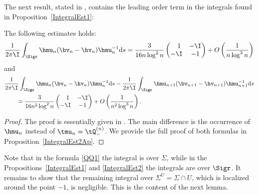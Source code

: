The next result, stated in \cite[Section~5]{CD}, contains the leading order term in the integrals found in Proposition~\ref{IntegralEst1}:
\begin{Proposition}\label{IntegralEst2}
 The following estimates holds:
\begin{align*}
\frac{1}{2\pi\I} \int_{\Sigr} \hmu_n(\bv_n-\hv_n)\hmu_n^{-1} {\rm d}s = \frac{3}{16n \log^2n} \begin{pmatrix}
\phantom{-}1 & -\I\\
-\I & -1
\end{pmatrix} + O\left(\frac{1}{n\log^3 n}\right)
\end{align*}
and
\begin{align*}
 & \frac{1}{2\pi\I} \int_{\Sigr} \hmu_n(\bv_n-\hv_n)\hmu_n^{-1} {\rm d}s - \frac{1}{2\pi\I} \int_{\Sigr} \hmu_{n+1}(\bv_{n+1}-\hv_{n+1})\hmu^{-1}_{n+1} {\rm d}s
 \\
 &\qquad= \frac{3}{16n^2 \log^2n} \begin{pmatrix}
\phantom{-}1 & -\I\\
-\I & -1
\end{pmatrix} + O\left(\frac{1}{n^2\log^3 n}\right).
\end{align*}
\end{Proposition}
\begin{proof}
The proof is essentially given in \cite[Propositions~C.3 and C.4]{CD}. The main difference is the occurrence of $\hmu_n$ instead of $\tmu_n = \tQ^{(n)}_-$. We provide the full proof of both formulas in Proposition~\ref{IntegralEst2Ap}.
\end{proof}

Note that in the formula \eqref{QQ1} the integral is over $\Sigma$, while in the Propositions~\ref{IntegralEst1} and \ref{IntegralEst2} the integrals are over $\Sigr$. It remains to show that the remaining integral over $ \Sigma^U = \Sigma\cap U$, which is localized around the point $-1$, is negligible. This is the content of the next lemma.

